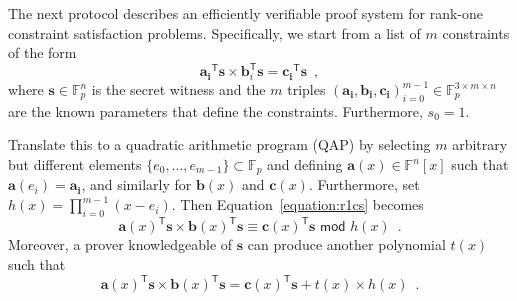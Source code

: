 \documentclass{article}
\begin{document}
The next protocol describes an efficiently verifiable proof system for rank-one constraint satisfaction problems. Specifically, we start from a list of $m$ constraints of the form
\begin{equation} \label{equation:r1cs}
    \mathbf{a_i}^\mathsf{T} \mathbf{s} \times \mathbf{b}_i^\mathsf{T} \mathbf{s} = \mathbf{c_i}^\mathsf{T} \mathbf{s} \enspace ,
\end{equation}
where $\mathbf{s} \in \mathbb{F}_p^n$ is the secret witness and the $m$ triples $(\mathbf{a_i}, \mathbf{b_i}, \mathbf{c_i})_{i=0}^{m-1} \in \mathbb{F}_p^{3 \times m \times n}$ are the known parameters that define the constraints. Furthermore, $s_0 = 1$.

Translate this to a quadratic arithmetic program (QAP) by selecting $m$ arbitrary but different elements $\{e_0, \ldots, e_{m-1}\} \subset \mathbb{F}_p$ and defining $\mathbf{a}(x) \in \mathbb{F}^n[x]$ such that $\mathbf{a}(e_i) = \mathbf{a_i}$, and similarly for $\mathbf{b}(x)$ and $\mathbf{c}(x)$. Furthermore, set $h(x) = \prod_{i=0}^{m-1} (x-e_i)$. Then Equation~\ref{equation:r1cs} becomes
\begin{equation} \label{equation:qap_modular}
    \mathbf{a}(x)^\mathsf{T}\mathbf{s} \times \mathbf{b}(x)^\mathsf{T}\mathbf{s} \equiv \mathbf{c}(x)^\mathsf{T}\mathbf{s} \,\, \mathsf{mod} \,\, h(x) \enspace .
\end{equation}
Moreover, a prover knowledgeable of $\mathbf{s}$ can produce another polynomial $t(x)$ such that
\begin{equation} \label{equation:qap_explicit}
    \mathbf{a}(x)^\mathsf{T}\mathbf{s} \times \mathbf{b}(x)^\mathsf{T}\mathbf{s} = \mathbf{c}(x)^\mathsf{T}\mathbf{s} + t(x) \times h(x) \enspace .
\end{equation}
\end{document}
